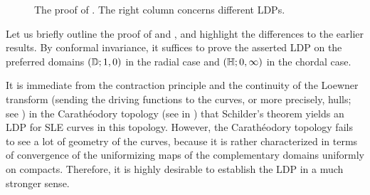 \documentclass[a4paper, 11pt]{article}
\theoremstyle{definition}
\numberwithin{equation}{section}
\numberwithin{figure}{section}
\begin{document}
\begin{figure}[h]
\begin{center}
\end{center}
\caption{The proof of .
The right column concerns different LDPs.}
\label{fig:steps}
\end{figure}


Let us briefly outline the proof of  and , 
and highlight the differences to the earlier results. 
By conformal invariance, it suffices to prove the asserted LDP on the preferred domains 
$(\mathbb{D}; 1, 0)$ in the radial case and $(\mathbb{H}; 0, \infty)$ in the chordal case.

It is immediate from the contraction principle and the continuity of the Loewner transform 
(sending the driving functions to the curves, or more precisely, hulls; see )  
in the Carath\'eodory topology (see  in ) that Schilder's theorem yields an LDP for SLE curves in this topology. 
However, the Carath\'eodory topology fails to see a lot of geometry of the curves, 
because it is rather characterized in terms of convergence of the uniformizing maps of the complementary domains uniformly on compacts. 
Therefore, it is highly desirable to establish the LDP in a much stronger sense.
\end{document}
